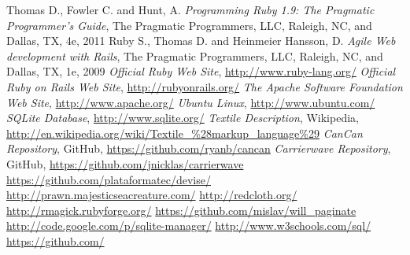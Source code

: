 \documentclass[12pt,twoside]{article}
\begin{document}
\newpage
\begin{thebibliography}{2}
 Thomas D., Fowler C. and Hunt, A.
\emph{Programming Ruby 1.9: The Pragmatic Programmer's Guide}, The Pragmatic Programmers, LLC, Raleigh, NC, and Dallas, TX, 4e, 2011
 Ruby S., Thomas D. and Heinmeier Hansson, D.
\emph{Agile Web development with Rails}, The Pragmatic Programmers, LLC, Raleigh, NC, and Dallas, TX, 1e, 2009
 \emph{Official Ruby Web Site}, \url{http://www.ruby-lang.org/}
 \emph{Official Ruby on Rails Web Site}, \url{http://rubyonrails.org/}
 \emph{The Apache Software Foundation Web Site}, \url{http://www.apache.org/}
 \emph{Ubuntu Linux}, \url{http://www.ubuntu.com/}
 \emph{SQLite Database}, \url{http://www.sqlite.org/}
 \emph{Textile Description}, Wikipedia, \url{http://en.wikipedia.org/wiki/Textile_%28markup_language%29}
 \emph{CanCan Repository}, GitHub, \url{https://github.com/ryanb/cancan}
 \emph{Carrierwave Repository}, GitHub, \url{https://github.com/jnicklas/carrierwave}
 \url{https://github.com/plataformatec/devise/}
 \url{http://prawn.majesticseacreature.com/}
 \url{http://redcloth.org/}
 \url{http://rmagick.rubyforge.org/}
 \url{https://github.com/mislav/will_paginate}
 \url{http://code.google.com/p/sqlite-manager/}
 \url{http://www.w3schools.com/sql/}
 \url{https://github.com/}
\end{thebibliography}
\end{document}
